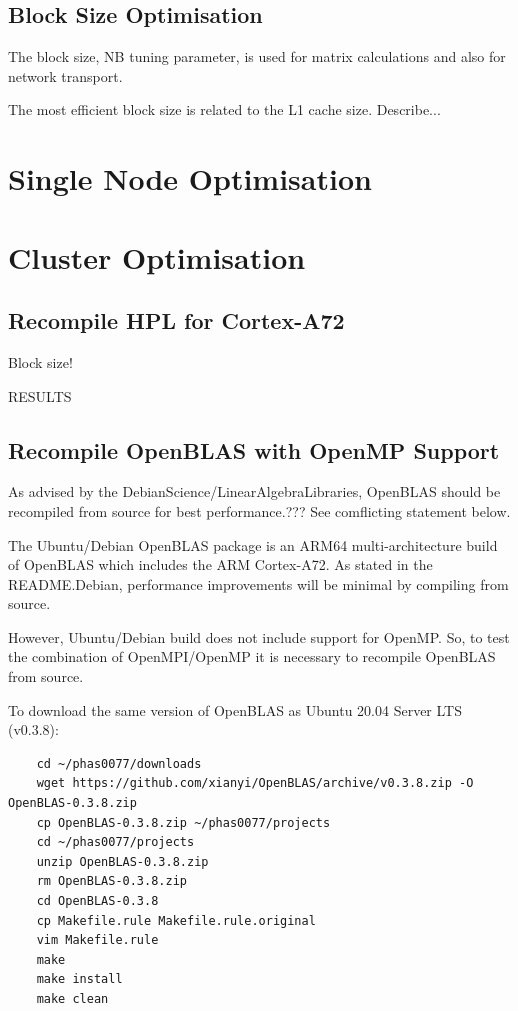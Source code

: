 \documentclass{article}
\begin{document}
\subsection{Block Size Optimisation}

The block size, NB tuning parameter, is used for matrix calculations and also for network transport.

The most efficient block size is related to the L1 cache size. Describe...


%
%
\section{Single Node Optimisation}


%
%
\section{Cluster Optimisation}




\subsection{Recompile HPL for Cortex-A72}

Block size!

RESULTS

\subsection{Recompile OpenBLAS with OpenMP Support}

As advised by the DebianScience/LinearAlgebraLibraries, OpenBLAS should be recompiled from source for best performance.??? See comflicting statement below.

The Ubuntu/Debian OpenBLAS package is an ARM64 multi-architecture build of OpenBLAS which includes the ARM Cortex-A72. As stated in the README.Debian, performance improvements will be minimal by compiling from source.

However, Ubuntu/Debian build does not include support for OpenMP. So, to test the combination of OpenMPI/OpenMP it is necessary to recompile OpenBLAS from source.

To download the same version of OpenBLAS as Ubuntu 20.04 Server LTS (v0.3.8):

\begin{verbatim}
    cd ~/phas0077/downloads
    wget https://github.com/xianyi/OpenBLAS/archive/v0.3.8.zip -O OpenBLAS-0.3.8.zip
    cp OpenBLAS-0.3.8.zip ~/phas0077/projects
    cd ~/phas0077/projects
    unzip OpenBLAS-0.3.8.zip
    rm OpenBLAS-0.3.8.zip
    cd OpenBLAS-0.3.8
    cp Makefile.rule Makefile.rule.original
    vim Makefile.rule
    make
    make install
    make clean
\end{verbatim}
\end{document}
